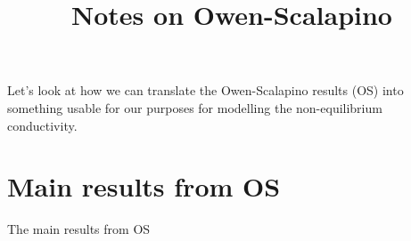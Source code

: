 \documentclass{article}
\title{Notes on Owen-Scalapino}
\begin{document}
\maketitle

Let's look at how we can translate the Owen-Scalapino results (OS)\cite{OwenScalapino} into something usable for our purposes for modelling the non-equilibrium conductivity.

\section{Main results from OS} \label{sec:intro}

The main results from OS 

\printbibliography
\end{document}
